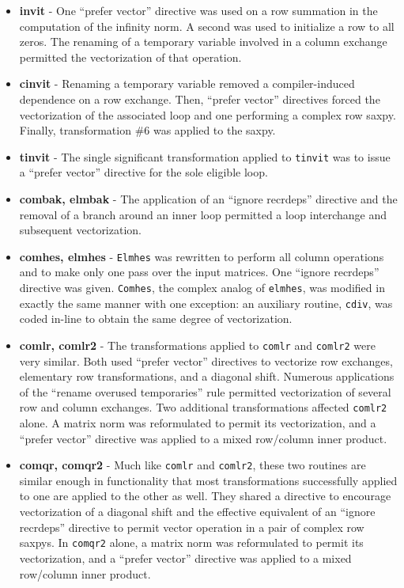 \begin{itemize}
\item {\bf invit} - One ``prefer vector'' directive was used
	on a row summation in the
     computation of the infinity norm.  A second was used to
     initialize a row to all zeros.  The renaming of a temporary
     variable involved in a column exchange permitted the
     vectorization of that operation.

\item {\bf cinvit} - Renaming a temporary variable removed a compiler-induced
     dependence on a row exchange.  Then, ``prefer vector'' directives forced
     the vectorization of the associated loop and one performing
     a complex row saxpy.  Finally, transformation \#6 was applied
     to the saxpy.

\item {\bf tinvit} -
	The single significant transformation applied to {\tt tinvit}
     was to issue a ``prefer vector'' directive for the sole eligible loop.

\item {\bf combak, elmbak} -
	The application of an ``ignore recrdeps'' directive and the removal
	of a branch around an inner loop permitted a loop interchange and
	subsequent vectorization.

\item {\bf comhes, elmhes} -
	{\tt Elmhes} was rewritten to perform all column
     operations and to make only one pass over the input matrices.
     One ``ignore recrdeps'' directive was given.
     {\tt Comhes}, the complex analog of {\tt elmhes}, was modified
     in exactly the same manner with one exception: an auxiliary
     routine, {\tt cdiv}, was coded in-line to obtain the same
     degree of vectorization.

\item {\bf comlr, comlr2 } -
	The transformations applied to {\tt comlr} and
     {\tt comlr2} were very similar.  Both used ``prefer vector''
     directives to vectorize row exchanges, elementary row
     transformations, and a diagonal shift.
     Numerous applications of the ``rename overused
     temporaries'' rule permitted vectorization of several
     row and column exchanges.  Two additional
     transformations affected {\tt comlr2} alone.  A matrix
     norm was reformulated to permit its vectorization, and
     a ``prefer vector'' directive was applied to a mixed row/column inner
     product.

\item {\bf comqr, comqr2} -
	Much like {\tt comlr} and {\tt comlr2}, these two routines
     are similar enough in functionality that most transformations
     successfully applied to one are applied to the other as well.
     They shared a directive to encourage vectorization of a
     diagonal shift and the effective equivalent of an ``ignore recrdeps'' directive
     to permit vector operation in a pair of complex row saxpys.
     In {\tt comqr2} alone, a matrix norm was reformulated to permit
     its vectorization, and a ``prefer vector'' directive was applied to a mixed row/column
     inner product.


\end{itemize}
